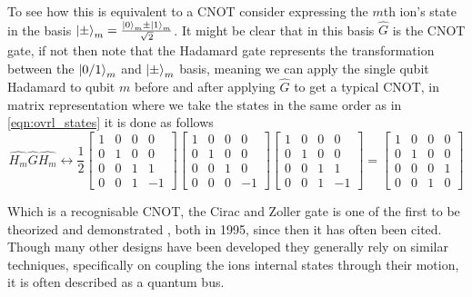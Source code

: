 To see how this is equivalent to a CNOT consider expressing the $m$th ion's state in the basis $\ket{\pm}_m = \frac{\ket{0}_m \pm \ket{1}_m}{\sqrt{2}}$.
It might be clear that in this basis $\hat{G}$ is the CNOT gate, if not then note that the Hadamard gate represents the transformation between the $\ket{0/1}_m$ and $\ket{\pm}_m$ basis, meaning we can apply the single qubit Hadamard to qubit $m$ before and after applying $\hat{G}$ to get a typical CNOT, in matrix representation where we take the states in the same order as in \cref{eqn:ovrl_states} it is done as follows
\begin{equation}
    \hat{H_m}\hat{G}\hat{H_m} \leftrightarrow \frac{1}{2}
    \begin{bmatrix}
        1 & 0 & 0 & 0 \\
        0 & 1 & 0 & 0 \\
        0 & 0 & 1 & 1 \\
        0 & 0 & 1 & -1
    \end{bmatrix}
    \begin{bmatrix}
        1 & 0 & 0 & 0 \\
        0 & 1 & 0 & 0 \\
        0 & 0 & 1 & 0 \\
        0 & 0 & 0 & -1
    \end{bmatrix}
    \begin{bmatrix}
        1 & 0 & 0 & 0 \\
        0 & 1 & 0 & 0 \\
        0 & 0 & 1 & 1 \\
        0 & 0 & 1 & -1
    \end{bmatrix} = 
    \begin{bmatrix}
        1 & 0 & 0 & 0 \\
        0 & 1 & 0 & 0 \\
        0 & 0 & 0 & 1 \\
        0 & 0 & 1 & 0
    \end{bmatrix}
\end{equation}

Which is a recognisable CNOT, the Cirac and Zoller gate is one of the first to be theorized and demonstrated \cite{monroeDemonstrationFundamentalQuantum1995}, both in 1995, since then it has often been cited.
Though many other designs have been developed they generally rely on similar techniques, specifically on coupling the ions internal states through their motion, it is often described as a quantum bus.





